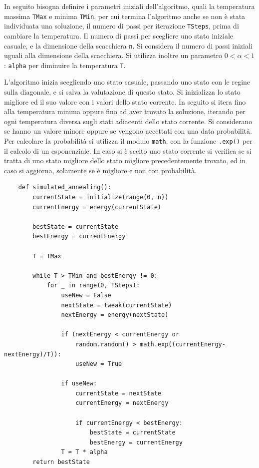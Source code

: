 \documentclass{article}
\numberwithin{equation}{subsection}
\begin{document}
In seguito bisogna definire i parametri iniziali dell'algoritmo, quali la temperatura massima \verb|TMax| e minima \verb|TMin|, per cui termina l'algoritmo anche se non è stata individuata una soluzione, il numero di passi per 
iterazione \verb|TSteps|, prima di cambiare la temperatura. Il numero di passi per scegliere uno stato iniziale casuale, e la dimensione della scacchiera \verb|n|. Si considera il numero di passi iniziali uguali 
alla dimensione della scacchiera. Si utilizza inoltre un parametro $0<\alpha<1$: \verb|alpha| per diminuire la temperatura \verb|T|. 

L'algoritmo inizia scegliendo uno stato casuale, passando uno stato con le regine sulla diagonale, e si salva la valutazione di questo stato. Si inizializza lo stato migliore ed il suo valore con i valori 
dello stato corrente. 
In seguito si itera fino alla temperatura minima oppure fino ad aver trovato la soluzione, iterando per ogni temperatura diversa sugli stati adiacenti dello stato corrente. Si considerano se hanno un valore 
minore oppure se vengono accettati con una data probabilità. Per calcolare la probabilità si utilizza il modulo \verb|math|, con la funzione \verb|.exp()| per il calcolo di un esponenziale. In caso si è scelto 
uno stato corrente si verifica se si tratta di uno stato migliore dello stato migliore precedentemente trovato, ed in caso si aggiorna, solamente se è migliore e non con probabilità. 

\begin{verbatim}
    def simulated_annealing():
        currentState = initialize(range(0, n))
        currentEnergy = energy(currentState)

        bestState = currentState
        bestEnergy = currentEnergy

        T = TMax

        while T > TMin and bestEnergy != 0:
            for _ in range(0, TSteps):
                useNew = False
                nextState = tweak(currentState)
                nextEnergy = energy(nextState)
                
                if (nextEnergy < currentEnergy or 
                    random.random() > math.exp((currentEnergy-nextEnergy)/T)):
                    useNew = True
                
                if useNew:
                    currentState = nextState
                    currentEnergy = nextEnergy

                    if currentEnergy < bestEnergy:
                        bestState = currentState
                        bestEnergy = currentEnergy
                T = T * alpha
        return bestState
\end{verbatim}
\end{document}
